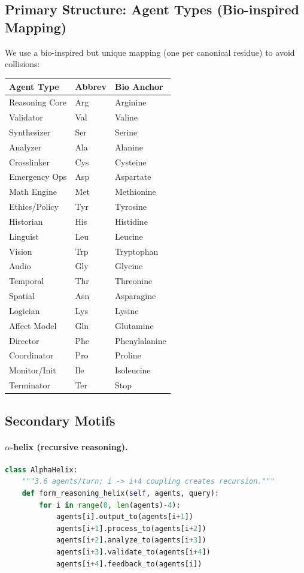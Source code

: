 \documentclass[11pt]{article}
\begin{document}
\subsection{Primary Structure: Agent Types (Bio-inspired Mapping)}
We use a bio-inspired but unique mapping (one per canonical residue) to avoid collisions:
\begin{center}
\renewcommand{\arraystretch}{1.1}
\begin{tabular}{@{}lll@{}}
\toprule
\textbf{Agent Type} & \textbf{Abbrev} & \textbf{Bio Anchor} \\
\midrule
Reasoning Core & Arg & Arginine \\
Validator & Val & Valine \\
Synthesizer & Ser & Serine \\
Analyzer & Ala & Alanine \\
Crosslinker & Cys & Cysteine \\
Emergency Ops & Asp & Aspartate \\
Math Engine & Met & Methionine \\
Ethics/Policy & Tyr & Tyrosine \\
Historian & His & Histidine \\
Linguist & Leu & Leucine \\
Vision & Trp & Tryptophan \\
Audio & Gly & Glycine \\
Temporal & Thr & Threonine \\
Spatial & Asn & Asparagine \\
Logician & Lys & Lysine \\
Affect Model & Gln & Glutamine \\
Director & Phe & Phenylalanine \\
Coordinator & Pro & Proline \\
Monitor/Init & Ile & Isoleucine \\
Terminator & Ter & Stop \\
\bottomrule
\end{tabular}
\end{center}
\subsection{Secondary Motifs}
\paragraph{$\alpha$-helix (recursive reasoning).}
\begin{lstlisting}[style=code,language=Python]
class AlphaHelix:
    """3.6 agents/turn; i -> i+4 coupling creates recursion."""
    def form_reasoning_helix(self, agents, query):
        for i in range(0, len(agents)-4):
            agents[i].output_to(agents[i+1])
            agents[i+1].process_to(agents[i+2])
            agents[i+2].analyze_to(agents[i+3])
            agents[i+3].validate_to(agents[i+4])
            agents[i+4].feedback_to(agents[i])
\end{lstlisting}
\end{document}
